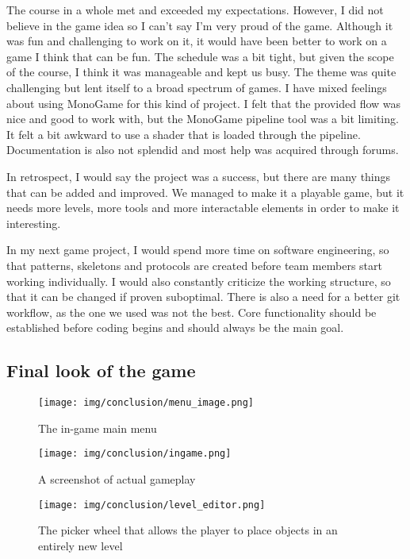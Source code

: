The course in a whole met and exceeded my expectations. However, I did not believe in the game idea so I can’t say I’m very proud of the game. Although it was fun and challenging to work on it, it would have been better to work on a game I think that can be fun. The schedule was a bit tight, but given the scope of the course, I think it was manageable and kept us busy. The theme was quite challenging but lent itself to a broad spectrum of games. I have mixed feelings about using MonoGame for this kind of project. I felt that the provided flow was nice and good to work with, but the MonoGame pipeline tool was a bit limiting. It felt a bit awkward to use a shader that is loaded through the pipeline. Documentation is also not splendid and most help was acquired through forums.

In retrospect, I would say the project was a success, but there are many things that can be added and improved. We managed to make it a playable game, but it needs more levels, more tools and more interactable elements in order to make it interesting. 

In my next game project, I would spend more time on software engineering, so that patterns, skeletons and protocols are created before team members start working individually. I would also constantly criticize the working structure, so that it can be changed if proven suboptimal. There is also a need for a better git workflow, as the one we used was not the best. Core functionality should be established before coding begins and should always be the main goal.

\subsection*{Final look of the game}

\begin{figure}[h!]
    \centering
    \texttt{[image: img/conclusion/menu\_image.png]}
    \caption{The in-game main menu}
\end{figure}

\begin{figure}[h!]
    \centering
    \texttt{[image: img/conclusion/ingame.png]}
    \caption{A screenshot of actual gameplay}
\end{figure}

\begin{figure}[h!]
    \centering
    \texttt{[image: img/conclusion/level\_editor.png]}
    \caption{The picker wheel that allows the player to place objects 
    in an entirely new level}
\end{figure}


